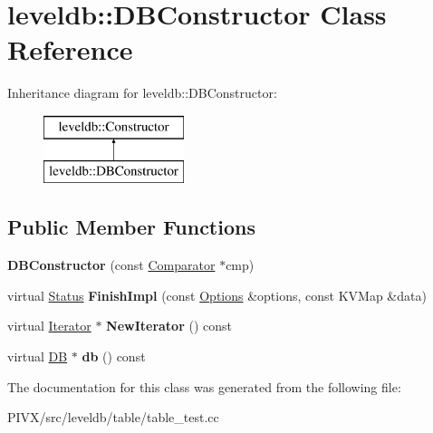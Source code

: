 \hypertarget{classleveldb_1_1_d_b_constructor}{}\section{leveldb\+:\+:D\+B\+Constructor Class Reference}
\label{classleveldb_1_1_d_b_constructor}
Inheritance diagram for leveldb\+:\+:D\+B\+Constructor\+:\begin{figure}[H]
\begin{center}
\leavevmode
\includegraphics[height=2.000000cm]{classleveldb_1_1_d_b_constructor}
\end{center}
\end{figure}
\subsection*{Public Member Functions}
\begin{DoxyCompactItemize}
\item 
\mbox{\label{classleveldb_1_1_d_b_constructor_ae27ecdd7732629b08c25a63f82dfd4a9}} 
{\bfseries D\+B\+Constructor} (const \mbox{\hyperlink{structleveldb_1_1_comparator}{Comparator}} $\ast$cmp)
\item 
\mbox{\label{classleveldb_1_1_d_b_constructor_a554d8e348d9135ff72a43a03c647c261}} 
virtual \mbox{\hyperlink{classleveldb_1_1_status}{Status}} {\bfseries Finish\+Impl} (const \mbox{\hyperlink{structleveldb_1_1_options}{Options}} \&options, const K\+V\+Map \&data)
\item 
\mbox{\label{classleveldb_1_1_d_b_constructor_a56f4fcae314be89539d319ae71016785}} 
virtual \mbox{\hyperlink{classleveldb_1_1_iterator}{Iterator}} $\ast$ {\bfseries New\+Iterator} () const
\item 
\mbox{\label{classleveldb_1_1_d_b_constructor_afd4a66dce1cd87d02c5e16d13165dabd}} 
virtual \mbox{\hyperlink{classleveldb_1_1_d_b}{DB}} $\ast$ {\bfseries db} () const
\end{DoxyCompactItemize}


The documentation for this class was generated from the following file\+:\begin{DoxyCompactItemize}
\item 
P\+I\+V\+X/src/leveldb/table/table\+\_\+test.\+cc\end{DoxyCompactItemize}

